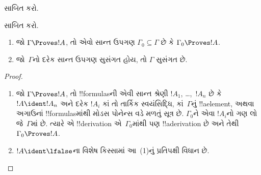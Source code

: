 \documentclass[../../../include/open-logic-section]{subfiles}
\begin{document}
\begin{prob}
 સાબિત કરો.
\end{prob}
\tagendprob

\begin{prob}
 સાબિત કરો.
\end{prob}
\tagendprob

\begin{prop}[સઘનતા]
  \begin{enumerate}
  \item જો $\Gamma \Proves !A$, તો એવો સાન્ત ઉપગણ $\Gamma_0
    \subseteq \Gamma$ છે કે $\Gamma_0 \Proves !A$.
  \item જો~$\Gamma$નો દરેક સાન્ત ઉપગણ સુસંગત હોય, તો $\Gamma$
    સુસંગત છે.
  \end{enumerate}
\end{prop}

\begin{proof}
  \begin{enumerate}
    \item જો $\Gamma \Proves !A$, તો !!{formula}sની એવી સાન્ત શ્રેણી
      $!A_1$, \dots,~$!A_n$ છે કે $!A \ident !A_n$ અને દરેક $!A_i$
      કાં તો તાર્કિક સ્વયંસિદ્ધિ, કાં~$\Gamma$નું !!a{element}, અથવા
      અગાઉનાં !!{formula}sમાંથી મોડસ પોનેન્સ વડે મળતું સૂત્ર છે.
      $\Gamma_0$ને એવા $!A_i$નો ગણ લો જે~$\Gamma$માં છે. ત્યારે એ
      !!{derivation} એ~$\Gamma_0$માંથી પણ !!a{derivation} છે અને તેથી
      $\Gamma_0 \Proves !A$.
    \item $!A \ident \lfalse$ના વિશેષ કિસ્સામાં આ~(1)નું
      પ્રતિપક્ષી વિધાન છે.
\end{enumerate}
\end{proof}

\end{document}
